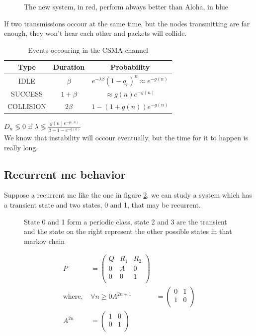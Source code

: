 \begin{figure} \centering
	
	\caption{The new system, in red, perform always better than Aloha, in blue}
	\label{}
\end{figure}
If two transmissions occour at the same time, but the nodes transmitting are far enough, they won't hear each other and packets will collide.

\begin{table}[h!]
	\centering
	\begin{tabular}{|c|c|c|}
		\textbf{Type} & \textbf{Duration} & \textbf{Probability} \\ \hline
		IDLE & $\beta$ & $e^{-\lambda \beta} (1-q_r)^n \approx e^{-g(n)}$ \\
		SUCCESS & $1+\beta$ & $\approx g(n) e^{-g(n)}$ \\
		COLLISION & $2 \beta$ & $1-(1+g(n)) e^{-g(n)}$
	\end{tabular}
	\caption{Events occouring in the CSMA channel}
	\label{TAB:tx_prob}
\end{table}
$D_n \lessgtr 0 $ if $\lambda \lessgtr \frac{g(n) e^{-g(n)}}{\beta + 1 - e^{-g(n)}}$\\
We know that instability will occour eventually, but the time for it to happen is really long.

\subsection{Recurrent \gls{mc} behavior}
Suppose a recurrent \gls{mc} like the one in figure \ref{fig:recurrMC}, we can study a system which has a transient state and two states, 0 and 1,
that may be recurrent.
\begin{figure}[h!]\centering
	
	\caption{ State 0 and 1 form a periodic class, state 2 and 3 are the transient
	and the state on the right represent the other possible states in that markov chain}
	\label{fig:recurrMC}
\end{figure}

\begin{equation}\begin{split}
	P&=\begin{pmatrix}
		Q & R_1 & R_2 \\
		0 & A  & 0 \\
		0 & 0  & 1 \\
	\end{pmatrix}\\
	\text{where, }&\forall n\ge 0
	A^{2n+1}&=\begin{pmatrix}
		0 & 1 \\
		1 & 0 \\
	\end{pmatrix}\\
	A^{2n}&=\begin{pmatrix}
		1 & 0 \\
		0 & 1 \\
	\end{pmatrix}\\
\end{split}\end{equation}

